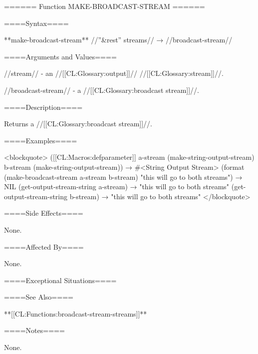 ====== Function MAKE-BROADCAST-STREAM ======

====Syntax====

**make-broadcast-stream** //''&rest'' streams// → //broadcast-stream//

====Arguments and Values====

//stream// - an //[[CL:Glossary:output]]// //[[CL:Glossary:stream]]//.

//broadcast-stream// - a //[[CL:Glossary:broadcast stream]]//.

====Description====

Returns a //[[CL:Glossary:broadcast stream]]//.

====Examples====

<blockquote> ([[CL:Macros:defparameter]] a-stream (make-string-output-stream) b-stream (make-string-output-stream)) → #<String Output Stream> (format (make-broadcast-stream a-stream b-stream) "this will go to both streams") → NIL (get-output-stream-string a-stream) → "this will go to both streams" (get-output-stream-string b-stream) → "this will go to both streams" </blockquote>

====Side Effects====

None.


====Affected By====

None.

====Exceptional Situations====


====See Also====

**[[CL:Functions:broadcast-stream-streams]]**

====Notes====

None.

